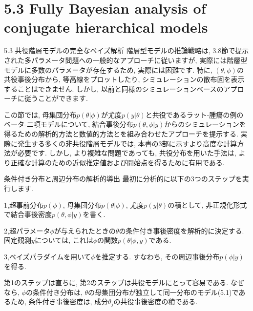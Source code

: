 \documentclass[10pt,dvipdfmx,a4]{beamer}
\begin{document}
\section{5.3 Fully Bayesian analysis of conjugate hierarchical models}
\begin{frame}{5.3 共役階層モデルの完全なベイズ解析}
階層型モデルの推論戦略は, 3.8節で提示された多パラメータ問題への一般的なアプローチに従いますが, 実際には階層型モデルに多数のパラメータが存在するため, 実際には困難です.
特に, $(\theta,\phi)$の共役事後分布から, 等高線をプロットしたり, シミュレーションの散布図を表示することはできません.
しかし, 以前と同様のシミュレーションベースのアプローチに従うことができます.

この節では, 母集団分布$p(\theta|\phi)$が尤度$p(y|\theta)$と共役であるラット-腫瘍の例のベータ-二項モデルについて, 結合事後分布$p(\theta,\phi|y)$からのシミュレーションを得るための解析的方法と数値的方法とを組み合わせたアプローチを提示する.
実際に発生する多くの非共役階層モデルでは, 本書の3部に示すより高度な計算方法が必要です.
しかし, より複雑な問題であっても, 共役分布を用いた手法は, より正確な計算のための近似推定値および開始点を得るために有用である.
\end{frame}


\begin{frame}{条件付き分布と周辺分布の解析的導出}
最初に分析的に以下の3つのステップを実行します.

1,超事前分布$p(\phi)$, 母集団分布$p(\theta|\phi)$, 尤度$p(y|\theta)$の積として, 非正規化形式で結合事後密度$p(\theta,\phi|y)$を書く.

2,超パラメータ$\phi$が与えられたときの$\theta$の条件付き事後密度を解析的に決定する.
固定観測$y$については, これは$\phi$の関数$p(\theta|\phi, y)$である.

3,ベイズパラダイムを用いて$\phi$を推定する.
すなわち, その周辺事後分布$p(\phi|y)$を得る.

第1のステップは直ちに, 第2のステップは共役モデルにとって容易である.
なぜなら, $\phi$の条件付き分布は, $\theta$の母集団分布が独立して同一分布のモデル(5.1)であるため, 条件付き事後密度は, 成分$\theta_j$の共役事後密度の積である.
\end{frame}

\end{document}

